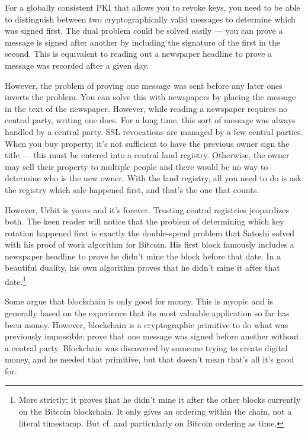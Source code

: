 \documentclass[twoside]{article}
\begin{document}
For a globally consistent PKI that allows you to revoke keys, you need
to be able to distinguish between two cryptographically valid messages
to determine which was signed first. The dual problem could be solved
easily --- you can prove a message is signed after another by including
the signature of the first in the second. This is equivalent to reading
out a newspaper headline to prove a message was recorded after a given
day.

However, the problem of proving one message was sent before any later
ones inverts the problem. You can solve this with newspapers by placing
the message in the text of the newspaper. However, while reading a
newspaper requires no central party, writing one does. For a long time,
this sort of message was always handled by a central party. SSL
revocations are managed by a few central parties. When you buy property,
it's not sufficient to have the previous owner sign the title --- this
must be entered into a central land registry. Otherwise, the owner may
sell their property to multiple people and there would be no way to
determine who is the new owner. With the land registry, all you need to
do is ask the registry which sale happened first, and that's the one
that counts.

However, Urbit is yours and it's forever. Trusting central registries
jeopardizes both. The keen reader will notice that the problem of
determining which key rotation happened first is exactly the
double-spend problem that Satoshi solved with his proof of work
algorithm for Bitcoin. His first block famously includes a newspaper
headline to prove he didn't mine the block before that date. In a
beautiful duality, his own algorithm proves that he didn't mine it after
that date.\footnote{More strictly: it proves that he didn't mine it after the other blocks
currently on the Bitcoin blockchain. It only gives an ordering within
the chain, not a literal
timestamp.  But cf. \citet{Gigi2019} and particularly \citet{Gigi2021} on Bitcoin ordering as time.}

Some argue that blockchain is only good for money. This is myopic and is
generally based on the experience that its most valuable application so
far has been money. However, blockchain is a cryptographic primitive to
do what was previously impossible: prove that one message was signed
before another without a central party. Blockchain was discovered by
someone trying to create digital money, and he needed that primitive,
but that doesn't mean that's all it's good for.
\end{document}

